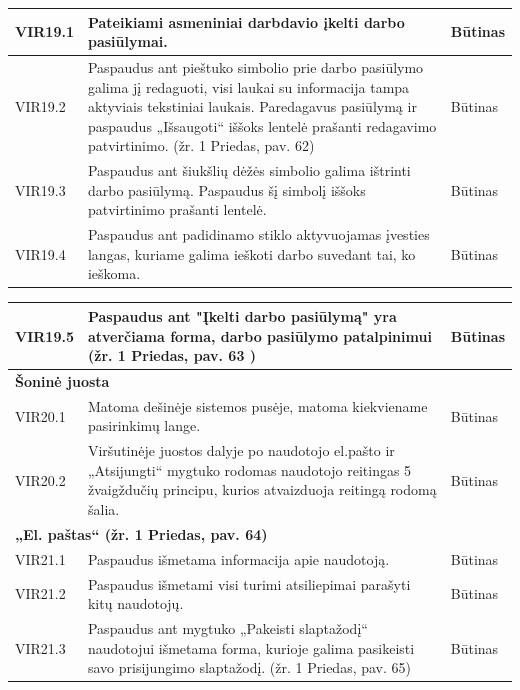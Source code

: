\documentclass{VUMIFPSkursinis}
\begin{document}
\begin{table}[H]
\begin{tabular}{|p{2cm}|p{10cm}|p{3cm}|}
VIR19.1 & \multicolumn{1}{m{10cm}|}{Pateikiami asmeniniai darbdavio įkelti darbo pasiūlymai.} & Būtinas \\ \hline
VIR19.2 & \multicolumn{1}{m{10cm}|}{Paspaudus ant pieštuko simbolio prie darbo pasiūlymo galima jį redaguoti, visi laukai su informacija tampa aktyviais tekstiniai laukais. Paredagavus pasiūlymą ir paspaudus „Išsaugoti“ iššoks lentelė prašanti redagavimo patvirtinimo. (žr. 1 Priedas, pav. 62)} & Būtinas \\ \hline
VIR19.3 & \multicolumn{1}{m{10cm}|}{Paspaudus ant šiukšlių dėžės simbolio galima ištrinti  darbo pasiūlymą. Paspaudus šį simbolį iššoks patvirtinimo prašanti lentelė.} & Būtinas \\ \hline
VIR19.4 & \multicolumn{1}{m{10cm}|}{Paspaudus ant padidinamo stiklo aktyvuojamas įvesties langas, kuriame galima ieškoti darbo suvedant tai, ko ieškoma.} & Būtinas \\ \hline
\end{tabular}
\end{table}

\begin{table}[H]
\centering
\normalsize
\begin{tabular}{|p{2cm}|p{10cm}|p{3cm}|}
\hline
VIR19.5 & \multicolumn{1}{m{10cm}|}{Paspaudus ant "Įkelti darbo pasiūlymą" yra atverčiama forma, darbo pasiūlymo patalpinimui (žr. 1 Priedas, pav. 63 )} & Būtinas \\ \hline

\multicolumn{3}{|l|}{\textbf{Šoninė juosta}} \\ \hline
VIR20.1 & \multicolumn{1}{m{10cm}|}{Matoma dešinėje sistemos pusėje, matoma kiekviename pasirinkimų lange.} & Būtinas \\ \hline
VIR20.2 & \multicolumn{1}{m{10cm}|}{Viršutinėje juostos dalyje po naudotojo el.pašto ir „Atsijungti“ mygtuko rodomas naudotojo reitingas 5 žvaigždučių principu, kurios atvaizduoja reitingą rodomą šalia.} & Būtinas \\ \hline
\multicolumn{3}{|l|}{\textbf{„El. paštas“ (žr. 1 Priedas, pav. 64)}} \\ \hline
VIR21.1 & \multicolumn{1}{m{10cm}|}{Paspaudus išmetama informacija apie naudotoją.} & Būtinas \\ \hline
VIR21.2 & \multicolumn{1}{m{10cm}|}{Paspaudus išmetami visi turimi atsiliepimai parašyti kitų naudotojų.} & Būtinas \\ \hline
VIR21.3 & \multicolumn{1}{m{10cm}|}{Paspaudus ant mygtuko „Pakeisti slaptažodį“ naudotojui išmetama forma, kurioje galima pasikeisti savo prisijungimo slaptažodį. (žr. 1 Priedas, pav. 65)} & Būtinas \\ \hline
\end{tabular}
\end{table}
\end{document}
